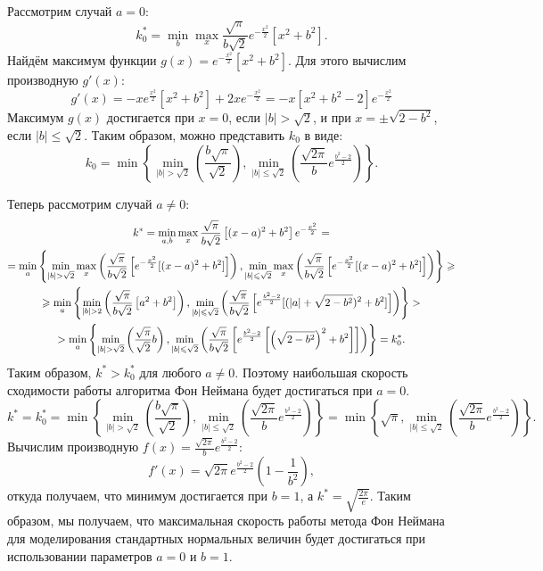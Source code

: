 \documentclass[11pt]{article}
\newcommand\abs[1]{\left\lvert#1\right\rvert}
\begin{document}
Рассмотрим случай $a=0$:
$$
k^*_0 = \min\limits_b \max\limits_x \frac{\sqrt{\pi}}{b\sqrt{2}} e^{-\frac{x^2}{2}} \left[ x^2 + b^2 \right].
$$
Найдём максимум функции $g(x) = e^{-\frac{x^2}{2}} \left[ x^2 + b^2 \right]$. Для этого вычислим производную $g'(x)$:
$$
g'(x) = -xe^{\frac{x^2}{2}} \left[ x^2 + b^2 \right] + 2xe^{-\frac{x^2}{2}} = -x\left[ x^2 + b^2 - 2 \right]e^{-\frac{x^2}{2}}
$$
Максимум $g(x)$ достигается при $x=0$, если $\abs{b} > \sqrt{2}$, и при $x = \pm \sqrt{2-b^2}$, если $\abs{b} \leqslant \sqrt{2}$. Таким образом, можно представить $k_0$ в виде:
$$
k_0 = \min \left\{ \min\limits_{\abs{b} > \sqrt{2}} \left( \frac{b\sqrt{\pi}}{\sqrt{2}} \right), \min\limits_{\abs{b} \leqslant \sqrt{2}} \left( \frac{\sqrt{2\pi}}{b} e^{\frac{b^2 - 2}{2}} \right) \right\}.
$$

Теперь рассмотрим случай $a \neq 0$:
\begin{gather}
k^* = \min\limits_{a,b} \max\limits_{x} \frac{\sqrt{\pi}}{b\sqrt{2}} \left[ (x-a)^2 + b^2 \right]e^{-\frac{x^2}{2}} = \notag \\
= \min\limits_a \left\{ \min\limits_{\abs{b} > \sqrt{2}} \max\limits_x \left( \frac{\sqrt{\pi}}{b\sqrt{2}}\left[ e^{-\frac{x^2}{2}}[(x-a)^2 + b^2] \right] \right), \min\limits_{\abs{b} \leqslant \sqrt{2}} \max\limits_x \left( \frac{\sqrt{\pi}}{b\sqrt{2}}\left[ e^{-\frac{x^2}{2}}[(x-a)^2 + b^2] \right] \right)\right\} \geqslant \notag \\
\geqslant \min\limits_a \left\{ \min\limits_{\abs{b} > 2} \left( \frac{\sqrt{\pi}}{b\sqrt{2}} \left[ a^2 + b^2 \right] \right), \min\limits_{\abs{b} \leqslant \sqrt{2}} \left( \frac{\sqrt{\pi}}{b\sqrt{2}} \left[ e^{\frac{b^2-2}{2}} [(\abs{a} + \sqrt{2-b^2})^2 + b^2] \right] \right) \right\} > \notag \\
> \min\limits_a \left\{ \min\limits_{\abs{b} > \sqrt{2}} \left( \frac{\sqrt{\pi}}{\sqrt{2}}b \right),  \min\limits_{\abs{b} \leqslant \sqrt{2}} \left( \frac{\sqrt{\pi}}{b\sqrt{2}} \left[ e^{\frac{b^2-2}{2}} \left[\left( \sqrt{2-b^2} \right)^2 + b^2 \right] \right] \right) \right\} = k_0^*. \notag
\end{gather}
Таким образом, $k^* > k^*_0$ для любого $a \neq 0$. Поэтому наибольшая скорость сходимости работы алгоритма Фон Неймана будет достигаться при $a = 0$.
$$
k^* = k^*_0 = \min \left\{ \min\limits_{\abs{b} > \sqrt{2}} \left( \frac{b\sqrt{\pi}}{\sqrt{2}} \right), \min\limits_{\abs{b} \leqslant \sqrt{2}} \left( \frac{\sqrt{2\pi}}{b} e^{\frac{b^2-2}{2}} \right) \right\} = \min \left\{ \sqrt{\pi}, \min\limits_{\abs{b} \leqslant \sqrt{2}} \left( \frac{\sqrt{2\pi}}{b} e^{\frac{b^2-2}{2}} \right) \right\}.
$$
Вычислим производную $f(x) = \tfrac{\sqrt{2\pi}}{b} e^{\tfrac{b^2-2}{2}}$:
$$
f'(x) = \sqrt{2\pi} e^{\frac{b^2-2}{2}} \left( 1 - \frac{1}{b^2} \right),
$$
откуда получаем, что минимум достигается при $b=1$, а $k^* = \sqrt{\tfrac{2\pi}{e}}$. Таким образом, мы получаем, что максимальная скорость работы метода Фон Неймана для моделирования стандартных нормальных величин будет достигаться при использовании параметров $a = 0$ и $b = 1$.
\end{document}
